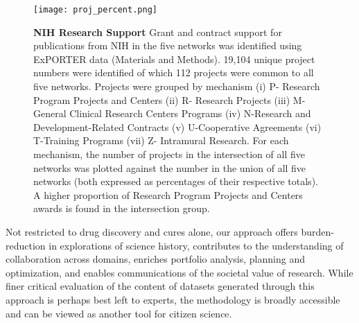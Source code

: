 \documentclass[10pt,letterpaper]{article}
\begin{document}
\begin{figure}[!h]
\centering
\texttt{[image: proj\_percent.png]}
\caption{{\bf NIH Research Support} Grant and contract support for publications from NIH in the five networks was identified using ExPORTER data (Materials and Methods). 19,104 unique project numbers were identified of which 112 projects were common to all five networks. Projects were grouped by mechanism (i) P-  Research Program Projects and Centers (ii) R- Research Projects (iii) M-General Clinical Research Centers Programs (iv) N-Research and Development-Related Contracts (v) U-Cooperative Agreements (vi) T-Training Programs (vii) Z- Intramural Research. For each mechanism, the number of projects in the intersection of all five networks was plotted against the number in the union of all five networks (both expressed as percentages of their respective totals). A higher proportion of Research Program Projects and Centers awards is found in the intersection group.}
\label{fig3}
\end{figure}

Not restricted to  drug discovery and cures alone, our approach offers burden-reduction in explorations of science history, contributes to the understanding of collaboration across domains, enriches portfolio analysis, planning and optimization, and enables communications of the societal value of research. While finer critical evaluation of the content of datasets generated through this approach is perhaps best left to experts, the methodology is broadly accessible and can be viewed as another tool for citizen science.
\end{document}
